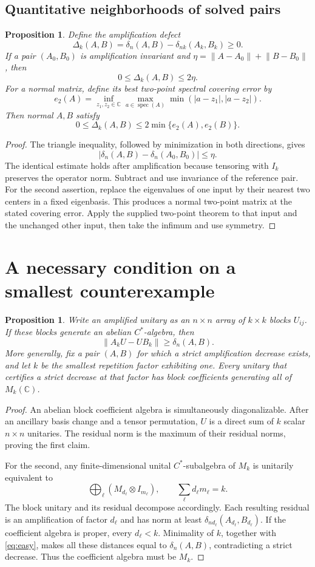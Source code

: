 \documentclass[11pt]{article}
\newtheorem{proposition}[theorem]{Proposition}
\theoremstyle{definition}\newtheorem{definition}[theorem]{Definition}
\theoremstyle{remark}\newtheorem{remark}[theorem]{Remark}
\newcommand{\C}{\mathbb C}
\newcommand{\spec}{\operatorname{spec}}
\newcommand{\norm}[1]{\left\lVert#1\right\rVert}
\newcommand{\dd}{\delta}
\begin{document}
\subsection{Quantitative neighborhoods of solved pairs}
\begin{proposition}\label{prop:lipschitz}
Define the amplification defect
\[
 \Delta_k(A,B)=\dd_n(A,B)-\dd_{nk}(A_k,B_k)\ge0.
\]
If a pair $(A_0,B_0)$ is amplification invariant and
$\eta=\norm{A-A_0}+\norm{B-B_0}$, then
\[
 0\le\Delta_k(A,B)\le2\eta.
\]
For a normal matrix, define its best two-point spectral covering error by
\[
 e_2(A)=\inf_{z_1,z_2\in\C}\max_{a\in\spec(A)}\min(|a-z_1|,|a-z_2|).
\]
Then normal $A,B$ satisfy
\[
 0\le\Delta_k(A,B)\le2\min\{e_2(A),e_2(B)\}.
\]
\end{proposition}
\begin{proof}
The triangle inequality, followed by minimization in both directions, gives
\[
 |\dd_n(A,B)-\dd_n(A_0,B_0)|\le\eta.
\]
The identical estimate holds after amplification because tensoring with $I_k$ preserves the operator norm. Subtract and use invariance of the reference pair. For the second assertion, replace the eigenvalues of one input by their nearest two centers in a fixed eigenbasis. This produces a normal two-point matrix at the stated covering error. Apply the supplied two-point theorem to that input and the unchanged other input, then take the infimum and use symmetry.
\end{proof}

\section{A necessary condition on a smallest counterexample}
\begin{proposition}\label{prop:ancilla}
Write an amplified unitary as an $n\times n$ array of $k\times k$ blocks $U_{ij}$. If these blocks generate an abelian $C^*$-algebra, then
\[
 \norm{A_kU-UB_k}\ge\dd_n(A,B).
\]
More generally, fix a pair $(A,B)$ for which a strict amplification decrease exists, and let $k$ be the smallest repetition factor exhibiting one. Every unitary that certifies a strict decrease at that factor has block coefficients generating all of $M_k(\C)$.
\end{proposition}
\begin{proof}
An abelian block coefficient algebra is simultaneously diagonalizable. After an ancillary basis change and a tensor permutation, $U$ is a direct sum of $k$ scalar $n\times n$ unitaries. The residual norm is the maximum of their residual norms, proving the first claim.

For the second, any finite-dimensional unital $C^*$-subalgebra of $M_k$ is unitarily equivalent to
\[
 \bigoplus_\ell(M_{d_\ell}\otimes I_{m_\ell}),\qquad
 \sum_\ell d_\ell m_\ell=k.
\]
The block unitary and its residual decompose accordingly. Each resulting residual is an amplification of factor $d_\ell$ and has norm at least $\dd_{nd_\ell}(A_{d_\ell},B_{d_\ell})$. If the coefficient algebra is proper, every $d_\ell<k$. Minimality of $k$, together with \eqref{eq:easy}, makes all these distances equal to $\dd_n(A,B)$, contradicting a strict decrease. Thus the coefficient algebra must be $M_k$.
\end{proof}
\end{document}
